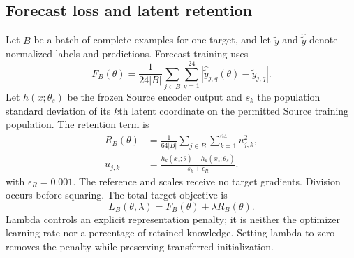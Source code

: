\subsection{Forecast loss and latent retention}
Let $B$ be a batch of complete examples for one target, and let $\widetilde y$ and $\widehat{\widetilde y}$ denote normalized labels and predictions. Forecast training uses
\begin{equation}
F_B(\theta)=\frac{1}{24|B|}\sum_{j\in B}\sum_{q=1}^{24}
\left|\widehat{\widetilde y}_{j,q}(\theta)-\widetilde y_{j,q}\right|.
\label{eq:forecastloss}\end{equation}
Let $h(x;\theta_s)$ be the frozen Source encoder output and $s_k$ the population standard deviation of its $k$th latent coordinate on the permitted Source training population. The retention term is
\begin{equation}\begin{aligned}
R_B(\theta)&=\frac{1}{64|B|}\sum_{j\in B}\sum_{k=1}^{64}u_{j,k}^{2},\\
u_{j,k}&=\frac{h_k(x_j;\theta)-h_k(x_j;\theta_s)}{s_k+\epsilon_R}.
\end{aligned}\label{eq:retention}\end{equation}
with $\epsilon_R=0.001$. The reference and scales receive no target gradients. Division occurs before squaring. The total target objective is
\begin{equation}
L_B(\theta,\lambda)=F_B(\theta)+\lambda R_B(\theta).
\label{eq:total}\end{equation}
Lambda controls an explicit representation penalty; it is neither the optimizer learning rate nor a percentage of retained knowledge. Setting lambda to zero removes the penalty while preserving transferred initialization.
